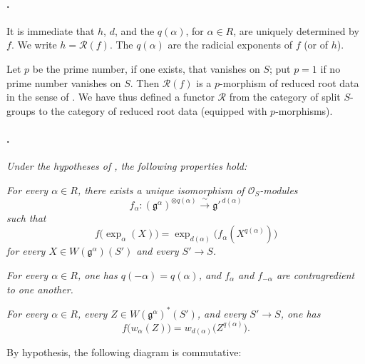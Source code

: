 \paragraph{.}
It is immediate that \(h\), \(d\), and the \(q(\alpha)\), for
\(\alpha\in R\), are uniquely determined by \(f\). We write
\(h=\mathscr R(f)\). The \(q(\alpha)\) are the radicial exponents
of \(f\) \textup{(or of \(h\))}.

Let \(p\) be the prime number, if one exists, that vanishes on
\(S\); put \(p=1\) if no prime number vanishes on \(S\). Then
\(\mathscr R(f)\) is a \(p\)-morphism of reduced root data in the
sense of . We have thus defined a functor
\(\mathscr R\) from the category of split \(S\)-groups to the
category of reduced root data \textup{(equipped with
\(p\)-morphisms)}.

\paragraph{.}
\textit{Under the hypotheses of , the following properties
hold:}

\textit{\textup{} For every \(\alpha\in R\), there exists a
unique isomorphism of \(\mathcal O_S\)-modules}
\[
  f_\alpha:
  (\mathfrak g^\alpha)^{\otimes q(\alpha)}
  \xrightarrow{\;\sim\;}
  \mathfrak g'^{\,d(\alpha)}
\]
\textit{such that}
\[
  f\bigl(\exp_\alpha(X)\bigr)
  =
  \exp_{d(\alpha)}
  \bigl(f_\alpha(X^{q(\alpha)})\bigr)
\]
\textit{for every \(X\in W(\mathfrak g^\alpha)(S')\) and every
\(S'\to S\).}

\textit{\textup{} For every \(\alpha\in R\), one has
\(q(-\alpha)=q(\alpha)\), and \(f_\alpha\) and \(f_{-\alpha}\) are
contragredient to one another.}

\textit{\textup{} For every \(\alpha\in R\), every
\(Z\in W(\mathfrak g^\alpha)^*(S')\), and every \(S'\to S\), one
has}
\[
  f\bigl(w_\alpha(Z)\bigr)
  =
  w_{d(\alpha)}\bigl(Z^{q(\alpha)}\bigr).
\]

By hypothesis, the following diagram is commutative:

\begin{center}


\end{center}

